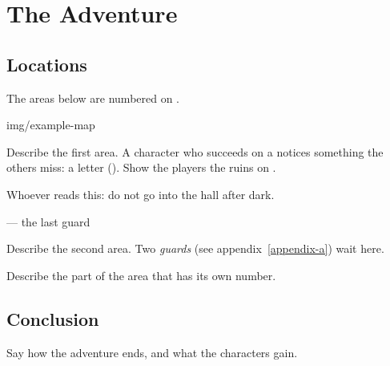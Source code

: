 \chapter{The Adventure}

\section{Locations}

The areas below are numbered on .

\begin{DndMap}[caption=The Ruins, label=ruins,
    scale={1 square = 5 feet}, compass]{img/example-map}
\end{DndMap}


Describe the first area. A character who succeeds on a  notices something the others miss: a letter (). Show the players the ruins on .

\begin{DndHandout}[style=letter, title={A Letter in the Gatehouse}, label=letter, appendix]
  Whoever reads this: do not go into the hall after dark.

  \hfill --- the last guard
\end{DndHandout}

Describe the second area. Two \emph{guards} (see appendix~\ref{appendix-a}) wait here.

Describe the part of the area that has its own number.

\section{Conclusion}

Say how the adventure ends, and what the characters gain.
